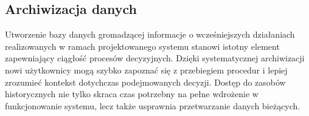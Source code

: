 \subsection{Archiwizacja danych}
Utworzenie bazy danych gromadzącej informacje o wcześniejszych działaniach realizowanych w ramach projektowanego systemu stanowi istotny element zapewniający ciągłość procesów decyzyjnych. Dzięki systematycznej archiwizacji nowi użytkownicy mogą szybko zapoznać się z przebiegiem procedur i lepiej zrozumieć kontekst dotychczas podejmowanych decyzji. Dostęp do zasobów historycznych nie tylko skraca czas potrzebny na pełne wdrożenie w funkcjonowanie systemu, lecz także usprawnia przetwarzanie danych bieżących.